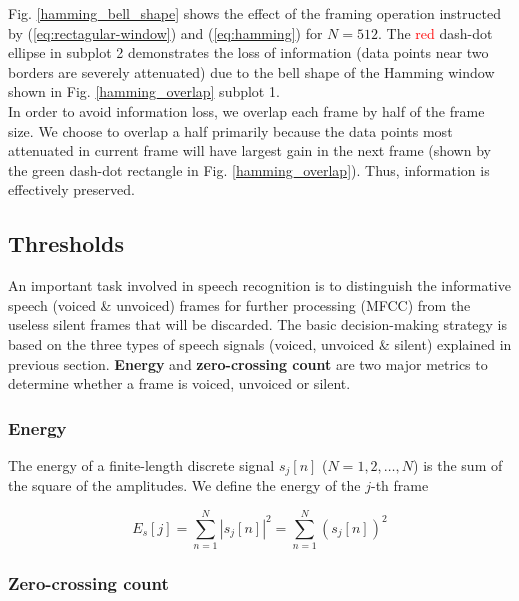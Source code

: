 Fig. \ref{hamming_bell_shape} shows the effect of the framing operation instructed by (\ref{eq:rectagular-window}) and (\ref{eq:hamming}) for $N = 512$. The \textcolor{red}{red} dash-dot ellipse in subplot 2 demonstrates the loss of information (data points near two borders are severely attenuated) due to the bell shape of the Hamming window shown in Fig. \ref{hamming_overlap} subplot 1.\\

In order to avoid information loss, we overlap each frame by half of the frame size. We choose to overlap a half primarily because the data points most attenuated in current frame will have largest gain in the next frame (shown by the \textcolor{green_html}{green} dash-dot rectangle in Fig. \ref{hamming_overlap}). Thus, information is effectively preserved.


\subsection{Thresholds}

An important task involved in speech recognition is to distinguish the informative speech (voiced \& unvoiced) frames for further processing (MFCC) from the useless silent frames that will be discarded. The basic decision-making strategy is based on the three types of speech signals (voiced, unvoiced \& silent) explained in previous section. \textbf{Energy} and \textbf{zero-crossing count} are two major metrics to determine whether a frame is voiced, unvoiced or silent.


\subsubsection{Energy}

The energy of a finite-length discrete signal $s_j[n]$ ($N = 1, 2, \dots, N$) is the sum of the square of the amplitudes. We define the energy of the $j$-th frame

\begin{equation}
\label{eq:frame-energy}
E_s[j] = \sum_{n=1}^{N} |s_j[n]|^2 = \sum_{n=1}^{N} (s_j[n])^2
\end{equation}


\subsubsection{Zero-crossing count}


